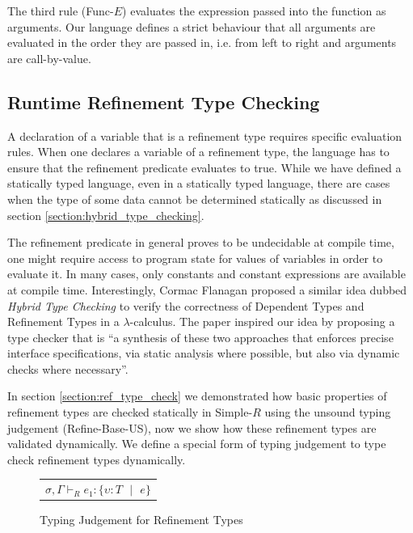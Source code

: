 \documentclass[a4paper,12pt]{report}
\begin{document}
\par
The third rule (Func-$E$) evaluates the expression passed into the 
function as arguments. Our language defines a strict behaviour that all 
arguments are evaluated in the order they are passed in, i.e. from left to right 
and arguments are call-by-value.

\subsection{Runtime Refinement Type Checking} \label{section:runtime_refine}
A declaration of a variable that is a refinement type requires specific 
evaluation rules. When one declares a variable of a refinement type, the language 
has to ensure that the refinement predicate evaluates to true. While we have 
defined a statically typed language, even in a statically typed language, 
there are cases when the type of some data cannot be determined statically as 
discussed in section \ref{section:hybrid_type_checking}.

\par
The refinement predicate in general proves to be undecidable 
at compile time, one might require access to program state for values 
of variables in order to evaluate it. In many cases, 
only constants and constant expressions are available at compile time. 
Interestingly, Cormac Flanagan proposed a similar idea dubbed \textit{Hybrid Type 
Checking} \cite{hybridTypeChecking} to verify the correctness of 
Dependent Types and Refinement Types in a $\lambda$-calculus. The paper 
inspired our idea by proposing a type checker that is 
``a synthesis of these two approaches that enforces precise interface 
specifications, via static analysis where possible, but also via 
dynamic checks where necessary''.

\par
In section \ref{section:ref_type_check} we demonstrated how basic properties 
of refinement types are checked statically in Simple-$R$ using 
the unsound typing judgement (Refine-Base-US), now we show 
how these refinement types are validated dynamically. 
We define a special form of typing judgement to type check 
refinement types dynamically.

\begin{figure}[H]
  \begin{center}
    \begin{tabular} {c}
      $\sigma, \Gamma \vdash_{R} e_1 : \{\upsilon : T \text{ }|\text{ }e\}$
    \end{tabular}
  \end{center}
  \caption{Typing Judgement for Refinement Types}
  \label{fig:refine_judgement}
\end{figure}
\end{document}

